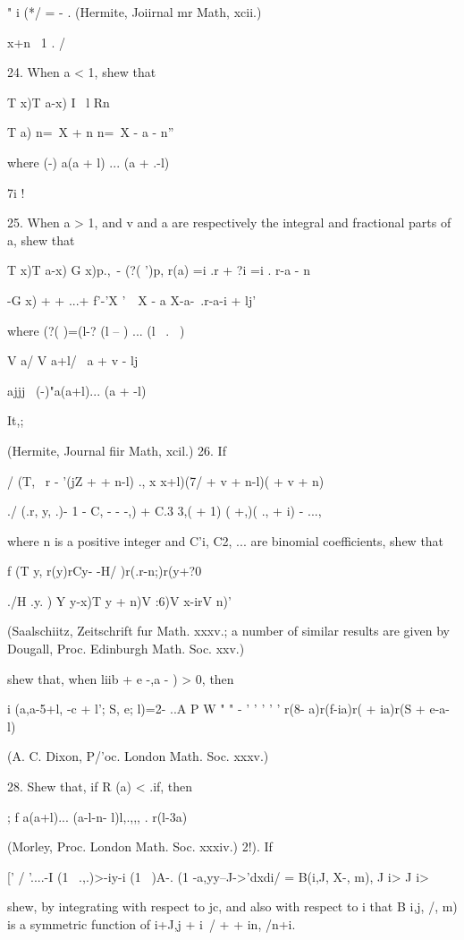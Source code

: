 " i (*/ = - . (Hermite, Joiirnal mr Math, xcii.)

x+n \ 1 . /

24. When a < 1, shew that

T x)T a-x) I \ l Rn

T a) n=\ X + n n=\ X - a - n''

where (-) a(a + l) ... (a + .-l)

7i !

25. When a > 1, and v and a are respectively the integral and
fractional parts of a, shew that

T x)T a-x) G x)p.,\ - (?( ')p, r(a) =i .r + ?i =i . r-a - n

-G x) + + ...+ f'-'X '\ \ X - a X-a-\ .r-a-i + lj'

%
%

where (?( )=(l-? (l -- ) ... (l \ . \ )

V a/ V a+l/ \ a + v - lj

ajjj \ (-)"a(a+l)... (a + -l)

It,;

(Hermite, Journal fiir Math, xcil.) 26. If

/ (T, \ r - '(jZ + + n-l) ., x x+l)(7/ + v + n-l)( + v + n)

./ (.r, y, .)- 1 - C, - - -,) + C.3 3,( + 1) ( +,)( ., + i) - ...,

where n is a positive integer and C'i, C2, ... are binomial
coefficients, shew that

f (T y, r(y)rCy- -H/ )r(.r-n;)r(y+?0

./H .y. ) Y y-x)T y + n)V :6)V x-irV n)'

(Saalschiitz, Zeitschrift fur Math. xxxv.; a number of similar
results are given by Dougall, Proc. Edinburgh Math. Soc. xxv.)

shew that, when liib + e -,a - ) > 0, then

i (a,a-5+l, -c + l'; S, e; l)=2- ..A P W " " - ' ' ' ' ' r(8-
a)r(f-ia)r( + ia)r(S + e-a-l)

(A. C. Dixon, P/'oc. London Math. Soc. xxxv.)

28. Shew that, if R (a) < .if, then

; f a(a+l)... (a-l-n- l)l,.,,, . r(l-3a)

(Morley, Proc. London Math. Soc. xxxiv.) 2!). If

[' / '....-I (1 \ .,.)>-iy-i (1 \ )A-. (1 -a,yy--J->'dxdi/ = B(i,J,
X-, m), J i> J i>

shew, by integrating with respect to jc, and also with respect to i
that B i,j, /, m) is a symmetric function of i+J,j + i\ / + + in,
/n+i.

